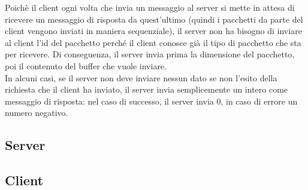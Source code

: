 \documentclass{article}
\begin{document}
Poichè il client ogni volta che invia un messaggio al server si mette in attesa di ricevere un messaggio di risposta da quest'ultimo (quindi i pacchetti da parte del 
client vengono inviati in maniera sequenziale), il server non ha bisogno di inviare al client l'id del pacchetto perché il client conosce già il tipo di pacchetto 
che sta per ricevere. Di conseguenza, il server invia prima la dimensione del pacchetto, poi il contenuto del buffer che vuole inviare. \\ In alcuni casi, se il server
non deve inviare nessun dato se non l'esito della richiesta che il client ha inviato, il server invia semplicemente un intero come messaggio di risposta:
nel caso di successo, il server invia 0, in caso di errore un numero negativo. 

\subsection{Server}

\subsection{Client}
\end{document}

